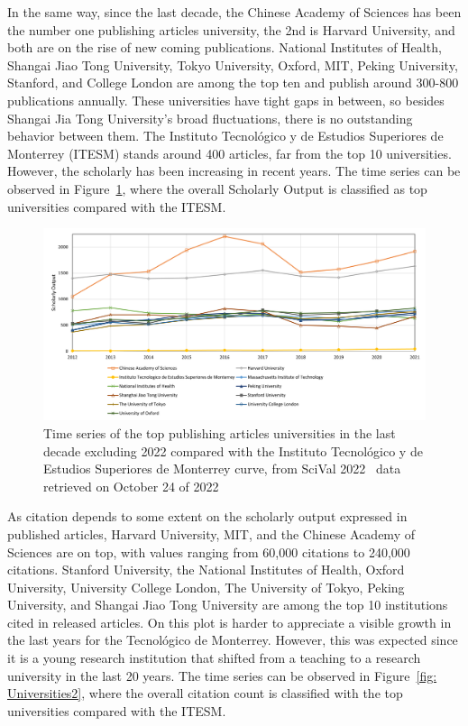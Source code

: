 \documentclass[conference]{IEEEtran}
\begin{document}
In the same way, since the last decade, the Chinese Academy of Sciences has been the number one publishing articles university, the 2nd is Harvard University, and both are on the rise of new coming publications. National Institutes of Health, Shangai Jiao Tong University, Tokyo University, Oxford, MIT, Peking University, Stanford, and College London are among the top ten and publish around 300-800 publications annually. These universities have tight gaps in between, so besides Shangai Jia Tong University's broad fluctuations, there is no outstanding behavior between them. The Instituto Tecnológico y de Estudios Superiores de Monterrey (ITESM) stands around 400 articles, far from the top 10 universities. However, the scholarly has been increasing in recent years. The time series can be observed in Figure~\ref{fig:Universities}, where the overall Scholarly Output is classified as top universities compared with the ITESM.

\begin{figure}[H]
    \centering
    \includegraphics[width = 9 cm]{Universities.png}
    \caption{Time series of the top publishing articles universities in the last decade excluding 2022 compared with the Instituto Tecnológico y de Estudios Superiores de Monterrey curve, from SciVal 2022~\cite{Scival2022} data retrieved on October 24 of 2022}
    \label{fig:Universities}
\end{figure}

As citation depends to some extent on the scholarly output expressed in published articles, Harvard University, MIT, and the Chinese Academy of Sciences are on top, with values ranging from 60,000 citations to 240,000 citations. Stanford University, the National Institutes of Health, Oxford University, University College London, The University of Tokyo, Peking University, and Shangai Jiao Tong University are among the top 10 institutions cited in released articles. On this plot is harder to appreciate a visible growth in the last years for the Tecnológico de Monterrey. However, this was expected since it is a young research institution that shifted from a teaching to a research university in the last 20 years. The time series can be observed in Figure~\ref{fig: Universities2}, where the overall citation count is classified with the top universities compared with the ITESM.
\end{document}
